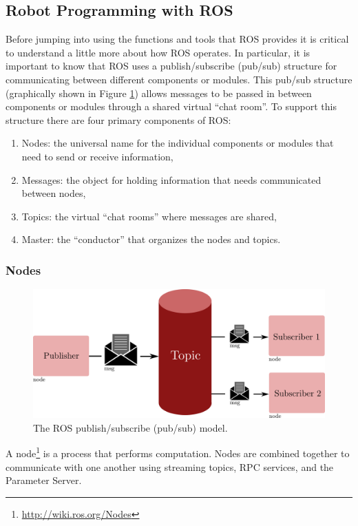\subsection{Robot Programming with ROS}
Before jumping into using the functions and tools that ROS provides it is critical to understand a little more about how ROS operates. In particular, it is important to know that ROS uses a publish/subscribe (pub/sub) structure for communicating between different components or modules. This pub/sub structure (graphically shown in Figure \ref{chat_room}) allows messages to be passed in between components or modules through a shared virtual ``chat room''. To support this structure there are four primary components of ROS:
\begin{enumerate}
    \item Nodes: the universal name for the individual components or modules that need to send or receive information,
    \item Messages: the object for holding information that needs communicated between nodes,
    \item Topics: the virtual ``chat rooms'' where messages are shared,
    \item Master: the ``conductor'' that organizes the nodes and topics.
\end{enumerate}

\subsubsection{Nodes}

\begin{figure}[t] 
    \centering 
    \includegraphics[width=0.65\linewidth]{tex/figs/ch24_figs/pub_sub.png}
    \caption{The ROS publish/subscribe (pub/sub) model.}
    \label{chat_room} 
\end{figure}

\begin{definition}[Node]
A node\footnote{\url{http://wiki.ros.org/Nodes}} is a process that performs computation. Nodes are combined together to communicate with one another using streaming topics, RPC services, and the Parameter Server.
\end{definition}

